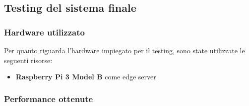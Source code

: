 \subsection{Testing del sistema finale}

\subsubsection{Hardware utilizzato}

Per quanto riguarda l'hardware impiegato per il testing, sono state utilizzate le seguenti risorse:

\begin{itemize}
  \item \textbf{Raspberry Pi 3 Model B} come edge server %
\end{itemize}

\subsubsection{Performance ottenute}
